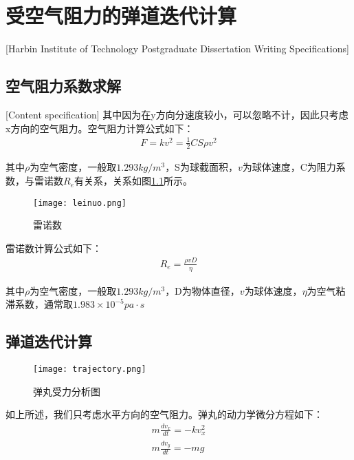 
\chapter[受空气阻力的弹道迭代计算]{受空气阻力的弹道迭代计算}[Harbin Institute of Technology Postgraduate Dissertation Writing Specifications]



\section{空气阻力系数求解}[Content specification]
其中因为在y⽅向分速度较⼩，可以忽略不计，因此只考虑x⽅向的空⽓阻⼒。空气阻力计算公式如下：
\begin{gather}
    F = kv^2 =  \frac{1}{2} CS \rho  v^2
\end{gather}

\par

其中$\rho$为空气密度，一般取$1.293kg/m^3$，S为球截面积，$v$为球体速度，C为阻力系数，与雷诺数$R_e$有关系，关系如图\ref{空气阻力系数与雷诺数关系}所示。

\begin{figure}[H]
    \centering
    \texttt{[image: leinuo.png]} 
    \caption{雷诺数} 
    \label{空气阻力系数与雷诺数关系}
\end{figure}

\par 

雷诺数计算公式如下：
\begin{gather}
    R_e = \frac{\rho v D}{\eta}
\end{gather}

其中$\rho$为空气密度，一般取$1.293kg/m^3$，D为物体直径，$v$为球体速度，$\eta$为空气粘滞系数，通常取$1.983\times10^{-5}pa\cdot s$


\section{弹道迭代计算}
\begin{figure}[H]
    \centering
    \texttt{[image: trajectory.png]} 
    \caption{弹丸受力分析图} 
    \label{弹丸受力分析图}
\end{figure}

如上所述，我们只考虑水平方向的空气阻力。弹丸的动力学微分方程如下：
\begin{gather}
    m \frac{dv_x}{dt} = -k v_x^2 \\
    m \frac{dv_y}{dt} = -mg
\end{gather} 

